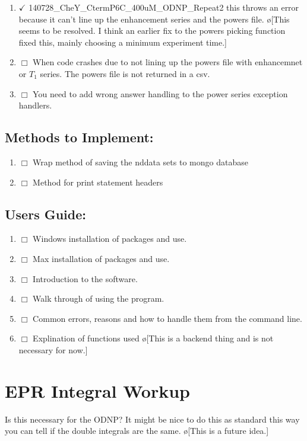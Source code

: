 \documentclass[10pt]{book}
\begin{document}
\begin{enumerate}
    \item $\checkmark$ 140728_CheY_CtermP6C_400uM_ODNP_Repeat2 this throws an error because it can't line up the enhancement series and the powers file. \o[This seems to be resolved. I think an earlier fix to the powers picking function fixed this, mainly choosing a minimum experiment time.]{}
    \item $\Box$ When code crashes due to not lining up the powers file with enhancemnet or $T_1$ series. The powers file is not returned in a csv.
    \item $\Box$ You need to add wrong answer handling to the power series exception handlers.
\end{enumerate}
\section{Methods to Implement:}
\begin{enumerate}
    \item $\Box$ Wrap method of saving the nddata sets to mongo database
    \item $\Box$ Method for print statement headers
\end{enumerate}
\section{Users Guide:}
\begin{enumerate}
    \item $\Box$ Windows installation of packages and use.
    \item $\Box$ Max installation of packages and use.
    \item $\Box$ Introduction to the software.
    \item $\Box$ Walk through of using the program.
    \item $\Box$ Common errors, reasons and how to handle them from the command line.
    \item $\Box$ Explination of functions used \o[This is a backend thing and is not necessary for now.]{}
\end{enumerate}
\chapter{EPR Integral Workup}
Is this necessary for the ODNP? It might be nice to do this as standard this way you can tell if the double integrals are the same. \o[This is a future idea.]
\end{document}
